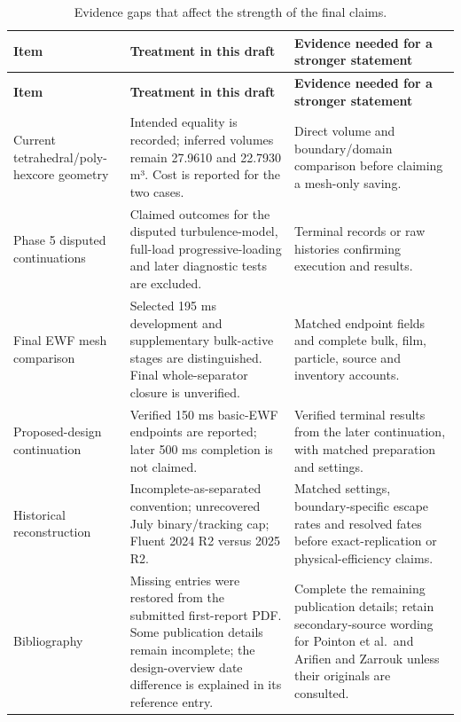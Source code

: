 \begin{longtable}{@{}>{\raggedright\arraybackslash}p{0.29000000\dimexpr\linewidth-4\tabcolsep\relax}>{\raggedright\arraybackslash}p{0.34000000\dimexpr\linewidth-4\tabcolsep\relax}>{\raggedright\arraybackslash}p{0.37000000\dimexpr\linewidth-4\tabcolsep\relax}@{}}
\caption{Evidence gaps that affect the strength of the final claims.}\label{tab:table-C.1}\\
\toprule
\textbf{Item} & \textbf{Treatment in this draft} & \textbf{Evidence needed for a stronger statement} \\
\midrule
\endfirsthead
\toprule
\textbf{Item} & \textbf{Treatment in this draft} & \textbf{Evidence needed for a stronger statement} \\
\midrule
\endhead
Current tetrahedral/poly-hexcore geometry & Intended equality is recorded; inferred volumes remain 27.9610 and 22.7930 m³. Cost is reported for the two cases. & Direct volume and boundary/domain comparison before claiming a mesh-only saving. \\
Phase 5 disputed continuations & Claimed outcomes for the disputed turbulence-model, full-load progressive-loading and later diagnostic tests are excluded. & Terminal records or raw histories confirming execution and results. \\
Final EWF mesh comparison & Selected 195 ms development and supplementary bulk-active stages are distinguished. Final whole-separator closure is unverified. & Matched endpoint fields and complete bulk, film, particle, source and inventory accounts. \\
Proposed-design continuation & Verified 150 ms basic-EWF endpoints are reported; later 500 ms completion is not claimed. & Verified terminal results from the later continuation, with matched preparation and settings. \\
Historical reconstruction & Incomplete-as-separated convention; unrecovered July binary/tracking cap; Fluent 2024 R2 versus 2025 R2. & Matched settings, boundary-specific escape rates and resolved fates before exact-replication or physical-efficiency claims. \\
Bibliography & Missing entries were restored from the submitted first-report PDF. Some publication details remain incomplete; the design-overview date difference is explained in its reference entry. & Complete the remaining publication details; retain secondary-source wording for Pointon et al.~and Arifien and Zarrouk unless their originals are consulted. \\
\bottomrule
\end{longtable}

